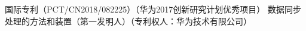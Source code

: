 \cvpub
{国际专利（PCT/CN2018/082225）（华为2017创新研究计划优秀项目）} %
{数据同步处理的方法和装置（第一发明人）（专利权人：华为技术有限公司）} %
{} %
{} %
{ %
}

